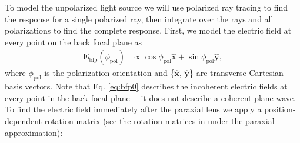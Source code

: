 \documentclass[]{osa-article}
\providecommand{\mb}[1]{\mathbf{#1}}
\providecommand{\mh}[1]{\mathbf{\hat{#1}}}
\begin{document}
To model the unpolarized light source we will use polarized ray tracing
\cite{foreman2011} to find the response for a single polarized ray, then
integrate over the rays and all polarizations to find the complete response.
First, we model the electric field at every point on the back focal plane as
\begin{align}
   \mb{E}_{\text{bfp}}(\phi_{\text{pol}}) &\propto \cos\phi_{\text{pol}}\mh{x} + \sin\phi_{\text{pol}}\mh{y}, \label{eq:bfp0}
\end{align}
where $\phi_{\text{pol}}$ is the polarization orientation and \{$\mh{x}$,
$\mh{y}$\} are transverse Cartesian basis vectors. Note that Eq. \ref{eq:bfp0}
describes the incoherent electric fields at every point in the back focal
plane--- it does not describe a coherent plane wave. To find the electric field
immediately after the paraxial lens we apply a position-dependent rotation
matrix (see the rotation matrices in \cite{foreman2011, backer2014} under the
paraxial approximation):
\end{document}
